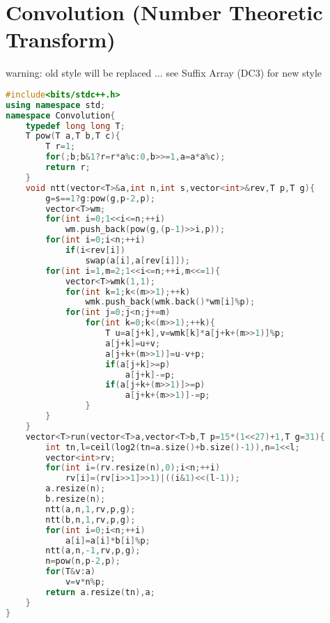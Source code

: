 \documentclass{book}
\begin{document}
\section{Convolution (Number Theoretic Transform)}
warning: old style will be replaced ... see Suffix Array (DC3) for new style\begin{lstlisting}[language=C++,title={Convolution (Number Theoretic Transform).hpp (1620 bytes, 51 lines)}]
#include<bits/stdc++.h>
using namespace std;
namespace Convolution{
    typedef long long T;
    T pow(T a,T b,T c){
        T r=1;
        for(;b;b&1?r=r*a%c:0,b>>=1,a=a*a%c);
        return r;
    }
    void ntt(vector<T>&a,int n,int s,vector<int>&rev,T p,T g){
        g=s==1?g:pow(g,p-2,p);
        vector<T>wm;
        for(int i=0;1<<i<=n;++i)
            wm.push_back(pow(g,(p-1)>>i,p));
        for(int i=0;i<n;++i)
            if(i<rev[i])
                swap(a[i],a[rev[i]]);
        for(int i=1,m=2;1<<i<=n;++i,m<<=1){
            vector<T>wmk(1,1);
            for(int k=1;k<(m>>1);++k)
                wmk.push_back(wmk.back()*wm[i]%p);
            for(int j=0;j<n;j+=m)
                for(int k=0;k<(m>>1);++k){
                    T u=a[j+k],v=wmk[k]*a[j+k+(m>>1)]%p;
                    a[j+k]=u+v;
                    a[j+k+(m>>1)]=u-v+p;
                    if(a[j+k]>=p)
                        a[j+k]-=p;
                    if(a[j+k+(m>>1)]>=p)
                        a[j+k+(m>>1)]-=p;
                }
        }
    }
    vector<T>run(vector<T>a,vector<T>b,T p=15*(1<<27)+1,T g=31){
        int tn,l=ceil(log2(tn=a.size()+b.size()-1)),n=1<<l;
        vector<int>rv;
        for(int i=(rv.resize(n),0);i<n;++i)
            rv[i]=(rv[i>>1]>>1)|((i&1)<<(l-1));
        a.resize(n);
        b.resize(n);
        ntt(a,n,1,rv,p,g);
        ntt(b,n,1,rv,p,g);
        for(int i=0;i<n;++i)
            a[i]=a[i]*b[i]%p;
        ntt(a,n,-1,rv,p,g);
        n=pow(n,p-2,p);
        for(T&v:a)
            v=v*n%p;
        return a.resize(tn),a;
    }
}
\end{lstlisting}
\end{document}
